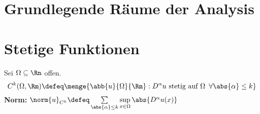 \documentclass[ngerman, 11pt]{article}
\begin{document}
	\section*{Grundlegende Räume der Analysis}
	
	\section*{Stetige Funktionen}
	Sei $\Omega \subseteq \Rn$ offen.
	\begin{equation*}
	C^k(\Omega, \Rm) \defeq \menge{\abb{u}{\Omega}{\Rm}: D^\alpha u \text{ stetig auf } \Omega \enskip \forall \abs{\alpha} \le k}
	\end{equation*}
	\textbf{Norm:} $\norm{u}_{C^k} \defeq \sum\limits_{\abs{\alpha} \le k} \sup\limits_{x \in \Omega} \abs{D^\alpha u(x)}$ 
	
\end{document}
